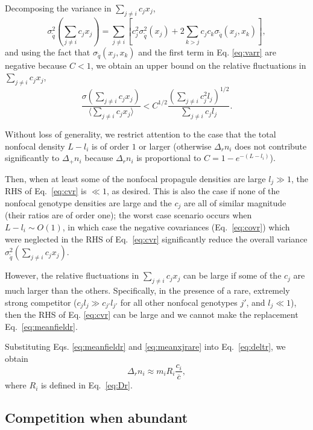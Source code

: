 \documentclass[11pt]{article}
\begin{document}
Decomposing the variance in $\sum_{j\neq i} c_j x_j$,
\begin{equation}
\sigma_{\tilde{q}}^2(\sum_{j\neq i} c_j x_j)=\sum_{j\neq i}\left[c_j^2\sigma_{\tilde{q}}^2(x_j)+2\sum_{k>j}c_j c_k\sigma_{\tilde{q}}(x_j,x_k)\right],\label{eq:vartotr}
\end{equation}
and using the fact that $\sigma_{\tilde{q}}(x_j,x_k)$ and the first term in Eq. \eqref{eq:varr} are negative because $C<1$, we obtain an upper bound on the relative fluctuations in $\sum_{j\neq i} c_j x_j$, 
\begin{equation}
\frac{\sigma(\sum_{j\neq i} c_j x_j)}{\langle\sum_{j\neq i} c_j x_j\rangle}<C^{1/2}\frac{\left(\sum_{j\neq i}c_j^2 l_j\right)^{1/2}}{\sum_{j\neq i}c_j l_j}. \label{eq:cvr}
\end{equation}

Without loss of generality, we restrict attention to the case that the total nonfocal density $L-l_i$ is of order $1$ or larger (otherwise $\Delta_r n_i$ does not contribute significantly to $\Delta_+ n_i$ because $\Delta_r n_i$ is proportional to $C=1-e^{-(L-l_i)}$).

Then, when at least some of the nonfocal propagule densities are large $l_j\gg 1$, the RHS of Eq.~\eqref{eq:cvr} is $\ll 1$, as desired. This is also the case if none of the nonfocal genotype densities are large and the $c_j$ are all of similar magnitude (their ratios are of order one); the worst case scenario occurs when $L-l_i\sim O(1)$, in which case the negative covariances (Eq.~\eqref{eq:covr}) which were neglected in the RHS of Eq.~\eqref{eq:cvr} significantly reduce the overall variance $\sigma_{\tilde{q}}^2(\sum_{j\neq i} c_j x_j)$.

However, the relative fluctuations in $\sum_{j\neq i} c_j x_j$ can be large if some of the $c_j$ are much larger than the others. Specifically, in the presence of a rare, extremely strong competitor ($c_j l_j\gg c_{j'} l_{j'}$ for all other nonfocal genotypes $j'$, and $l_j\ll 1$), then the RHS of Eq. \eqref{eq:cvr} can be large and we cannot make the replacement Eq.~\eqref{eq:meanfieldr}. 

Substituting Eqs. \eqref{eq:meanfieldr} and \eqref{eq:meanxjrare} into Eq.~\eqref{eq:deltr}, we obtain
\begin{equation}
\Delta_r n_i\approx m_i R_i\frac{c_i}{\overline{c}}, \label{eq:deltrfinal}
\end{equation}
where $R_i$ is defined in Eq.~\eqref{eq:Dr}.

\subsection*{Competition when abundant}
\end{document}
